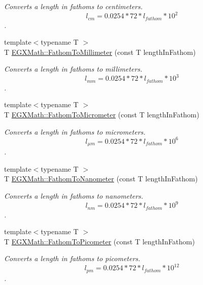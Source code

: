\begin{DoxyCompactItemize}
\begin{DoxyCompactList}\small\item\em Converts a length in fathoms to centimeters. \[ l_{cm}=0.0254 * 72 * l_{fathom} * 10^{2} \]. \end{DoxyCompactList}\item 
{\footnotesize template$<$typename T $>$ }\\T \mbox{\hyperlink{group___e_g_x_math-_conversions-_length_conversions-_imperial-_fathom-_s_i_gaa9e44fa377dc5d69f70d3974311ec89d}{E\+G\+X\+Math\+::\+Fathom\+To\+Millimeter}} (const T length\+In\+Fathom)
\begin{DoxyCompactList}\small\item\em Converts a length in fathoms to millimeters. \[ l_{mm}=0.0254 * 72 * l_{fathom} * 10^{3} \]. \end{DoxyCompactList}\item 
{\footnotesize template$<$typename T $>$ }\\T \mbox{\hyperlink{group___e_g_x_math-_conversions-_length_conversions-_imperial-_fathom-_s_i_gabc04c2f094545c3ae8d4e493e4af417e}{E\+G\+X\+Math\+::\+Fathom\+To\+Micrometer}} (const T length\+In\+Fathom)
\begin{DoxyCompactList}\small\item\em Converts a length in fathoms to micrometers. \[ l_{\mu m}=0.0254 * 72 * l_{fathom} * 10^{6} \]. \end{DoxyCompactList}\item 
{\footnotesize template$<$typename T $>$ }\\T \mbox{\hyperlink{group___e_g_x_math-_conversions-_length_conversions-_imperial-_fathom-_s_i_gad31bafe9815ccaf4f06f429e3eb9c242}{E\+G\+X\+Math\+::\+Fathom\+To\+Nanometer}} (const T length\+In\+Fathom)
\begin{DoxyCompactList}\small\item\em Converts a length in fathoms to nanometers. \[ l_{nm}=0.0254 * 72 * l_{fathom} * 10^{9} \]. \end{DoxyCompactList}\item 
{\footnotesize template$<$typename T $>$ }\\T \mbox{\hyperlink{group___e_g_x_math-_conversions-_length_conversions-_imperial-_fathom-_s_i_gad5fe5d3a1a48420dc43cd2826a9b6f71}{E\+G\+X\+Math\+::\+Fathom\+To\+Picometer}} (const T length\+In\+Fathom)
\begin{DoxyCompactList}\small\item\em Converts a length in fathoms to picometers. \[ l_{pm}=0.0254 * 72 * l_{fathom} * 10^{12} \]. \end{DoxyCompactList}\item 

\end{DoxyCompactItemize}
